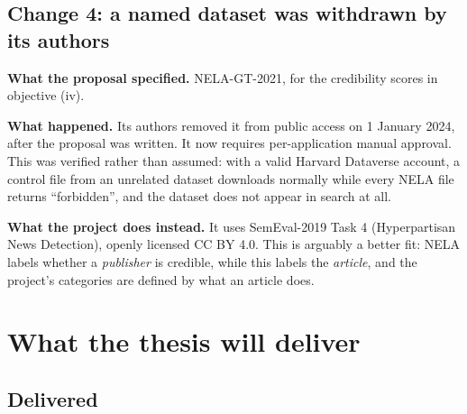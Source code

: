 \documentclass[11pt,a4paper]{article}
\begin{document}
\subsection{Change 4: a named dataset was withdrawn by its authors}

\textbf{What the proposal specified.} NELA-GT-2021, for the credibility scores in
objective (iv).

\textbf{What happened.} Its authors removed it from public access on 1 January 2024,
after the proposal was written. It now requires per-application manual approval.
This was verified rather than assumed: with a valid Harvard Dataverse account, a
control file from an unrelated dataset downloads normally while every NELA file
returns ``forbidden'', and the dataset does not appear in search at all.

\textbf{What the project does instead.} It uses SemEval-2019 Task 4 (Hyperpartisan
News Detection), openly licensed CC BY 4.0. This is arguably a better fit: NELA
labels whether a \emph{publisher} is credible, while this labels the \emph{article},
and the project's categories are defined by what an article does.

\section{What the thesis will deliver}

\subsection{Delivered}
\end{document}
